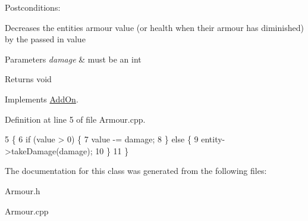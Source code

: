 Postconditions\+:
\begin{DoxyItemize}
\item Decreases the entities\textquotesingle{} armour value (or health when their armour has diminished) by the passed in value
\end{DoxyItemize}


\begin{DoxyParams}{Parameters}
{\em damage} & must be an int \\
\hline
\end{DoxyParams}
\begin{DoxyReturn}{Returns}
void 
\end{DoxyReturn}


Implements \hyperlink{classAddOn_ab3aefbc00969fe613ed6d42c4f55c5a2}{Add\+On}.



Definition at line 5 of file Armour.\+cpp.


\begin{DoxyCode}
5                                   \{
6     \textcolor{keywordflow}{if} (value > 0) \{
7         value -= damage;
8     \} \textcolor{keywordflow}{else} \{
9         entity->takeDamage(damage);
10     \}
11 \}
\end{DoxyCode}


The documentation for this class was generated from the following files\+:\begin{DoxyCompactItemize}
\item 
Armour.\+h\item 
Armour.\+cpp\end{DoxyCompactItemize}
